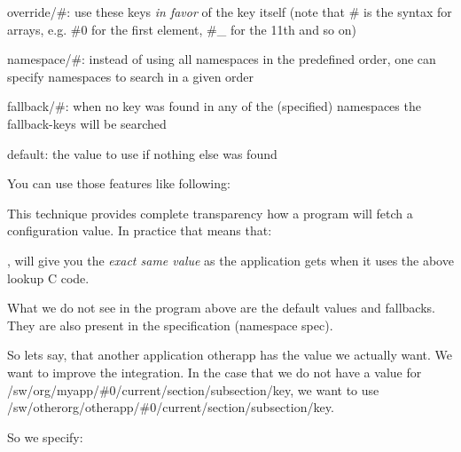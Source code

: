 \begin{DoxyItemize}
\item {\ttfamily override/\#}\+: use these keys {\itshape in favor} of the key itself (note that {\ttfamily \#} is the syntax for arrays, e.\+g. {\ttfamily \#0} for the first element, {\ttfamily \#\+\_} for the 11th and so on)
\item {\ttfamily namespace/\#}\+: instead of using all namespaces in the predefined order, one can specify namespaces to search in a given order
\item {\ttfamily fallback/\#}\+: when no key was found in any of the (specified) namespaces the {\ttfamily fallback}-\/keys will be searched
\item {\ttfamily default}\+: the value to use if nothing else was found
\end{DoxyItemize}

You can use those features like following\+:




This technique provides complete transparency how a program will fetch a configuration value. In practice that means that\+:




, will give you the {\itshape exact same value} as the application gets when it uses the above lookup C code.

What we do not see in the program above are the default values and fallbacks. They are also present in the specification (namespace {\ttfamily spec}).

So lets say, that another application {\ttfamily otherapp} has the value we actually want. We want to improve the integration. In the case that we do not have a value for {\ttfamily /sw/org/myapp/\#0/current/section/subsection/key}, we want to use {\ttfamily /sw/otherorg/otherapp/\#0/current/section/subsection/key}.

So we specify\+:




